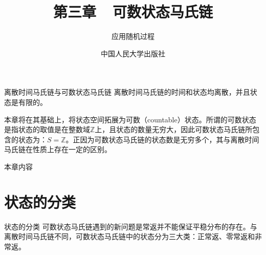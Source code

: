 \documentclass[t]{beamer}
\begin{document}
\fontsize{11}{18}\selectfont


\CTEXindent



  \title{第三章~~可数状态马氏链}
\author{应用随机过程}
\date{中国人民大学出版社}
  \begin{frame}
    \maketitle
  \end{frame}

  \begin{frame}{离散时间马氏链与可数状态马氏链}
    离散时间马氏链的时间和状态均离散，并且状态是有限的。
    
    本章将在其基础上，将状态空间拓展为可数（countable）状态。所谓的可数状态是指状态的取值是在整数域$\mathbb{Z}$上，且状态的数量无穷大，因此可数状态马氏链所包含的状态为：$S=\mathbb{Z}$。正因为可数状态马氏链的状态数是无穷多个，其与离散时间马氏链在性质上存在一定的区别。
  \end{frame}

\begin{frame}{本章内容}
    \tableofcontents
\end{frame}

\section{状态的分类}
\begin{frame}{状态的分类}
    可数状态马氏链遇到的新问题是常返并不能保证平稳分布的存在。与离散时间马氏链不同，可数状态马氏链中的状态分为三大类：正常返、零常返和非常返。
\end{frame}
\end{document}

